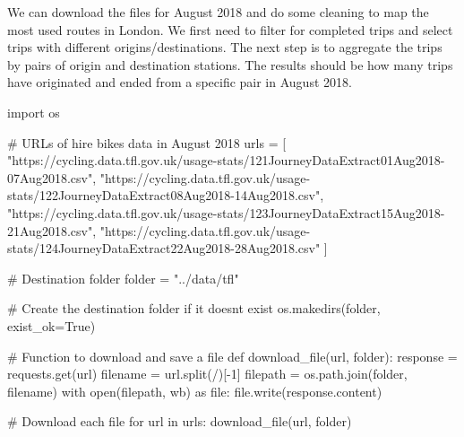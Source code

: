 \documentclass[
  letterpaper,
  DIV=11,
  numbers=noendperiod]{scrreprt}
\newenvironment{Shaded}{\begin{snugshade}}{\end{snugshade}}
\newcommand{\BuiltInTok}[1]{\textcolor[rgb]{0.00,0.23,0.31}{#1}}
\newcommand{\CommentTok}[1]{\textcolor[rgb]{0.37,0.37,0.37}{#1}}
\newcommand{\ControlFlowTok}[1]{\textcolor[rgb]{0.00,0.23,0.31}{#1}}
\newcommand{\DecValTok}[1]{\textcolor[rgb]{0.68,0.00,0.00}{#1}}
\newcommand{\ImportTok}[1]{\textcolor[rgb]{0.00,0.46,0.62}{#1}}
\newcommand{\KeywordTok}[1]{\textcolor[rgb]{0.00,0.23,0.31}{#1}}
\newcommand{\NormalTok}[1]{\textcolor[rgb]{0.00,0.23,0.31}{#1}}
\newcommand{\OperatorTok}[1]{\textcolor[rgb]{0.37,0.37,0.37}{#1}}
\newcommand{\StringTok}[1]{\textcolor[rgb]{0.13,0.47,0.30}{#1}}
\newcommand{\VariableTok}[1]{\textcolor[rgb]{0.07,0.07,0.07}{#1}}
\begin{document}
We can download the files for August 2018 and do some cleaning to map
the most used routes in London. We first need to filter for completed
trips and select trips with different origins/destinations. The next
step is to aggregate the trips by pairs of origin and destination
stations. The results should be how many trips have originated and ended
from a specific pair in August 2018.

\begin{Shaded}
\begin{Highlighting}[]
\ImportTok{import}\NormalTok{ os}

\CommentTok{\# URLs of hire bikes data in August 2018}
\NormalTok{urls }\OperatorTok{=}\NormalTok{ [}
    \StringTok{"https://cycling.data.tfl.gov.uk/usage{-}stats/121JourneyDataExtract01Aug2018{-}07Aug2018.csv"}\NormalTok{,}
    \StringTok{"https://cycling.data.tfl.gov.uk/usage{-}stats/122JourneyDataExtract08Aug2018{-}14Aug2018.csv"}\NormalTok{,}
    \StringTok{"https://cycling.data.tfl.gov.uk/usage{-}stats/123JourneyDataExtract15Aug2018{-}21Aug2018.csv"}\NormalTok{,}
    \StringTok{"https://cycling.data.tfl.gov.uk/usage{-}stats/124JourneyDataExtract22Aug2018{-}28Aug2018.csv"}
\NormalTok{    ]}

\CommentTok{\# Destination folder}
\NormalTok{folder }\OperatorTok{=} \StringTok{"../data/tfl"}

\CommentTok{\# Create the destination folder if it doesn\textquotesingle{}t exist}
\NormalTok{os.makedirs(folder, exist\_ok}\OperatorTok{=}\VariableTok{True}\NormalTok{)}

\CommentTok{\# Function to download and save a file}
\KeywordTok{def}\NormalTok{ download\_file(url, folder):}
\NormalTok{    response }\OperatorTok{=}\NormalTok{ requests.get(url)}
\NormalTok{    filename }\OperatorTok{=}\NormalTok{ url.split(}\StringTok{\textquotesingle{}/\textquotesingle{}}\NormalTok{)[}\OperatorTok{{-}}\DecValTok{1}\NormalTok{]}
\NormalTok{    filepath }\OperatorTok{=}\NormalTok{ os.path.join(folder, filename)}
    \ControlFlowTok{with} \BuiltInTok{open}\NormalTok{(filepath, }\StringTok{\textquotesingle{}wb\textquotesingle{}}\NormalTok{) }\ImportTok{as} \BuiltInTok{file}\NormalTok{:}
        \BuiltInTok{file}\NormalTok{.write(response.content)}

\CommentTok{\# Download each file}
\ControlFlowTok{for}\NormalTok{ url }\KeywordTok{in}\NormalTok{ urls:}
\NormalTok{    download\_file(url, folder)}
\end{Highlighting}
\end{Shaded}
\end{document}
